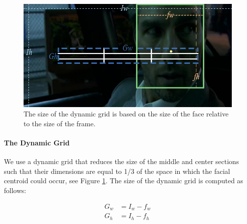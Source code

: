 \begin{figure}
\begin{center}
\includegraphics[width=0.98\linewidth]
    {fig/dyGrid.jpg}
\end{center}
\caption{The size of the dynamic grid is based on the size of the face relative to the size of the frame.}
\label{fig:dyGrid}
\end{figure}

\paragraph{The Dynamic Grid}

We use a dynamic grid that  reduces the size of the middle and center sections such that their dimensions are equal to 1/3 of the space in which the facial centroid could occur, see Figure \ref{fig:dyGrid}. The size of the dynamic grid is computed as follows: 

\begin{eqnarray}
  G_{w} &= I_{w} - f_{w} \\
  G_{h} &= I_{h} - f_{h}
\end{eqnarray}

